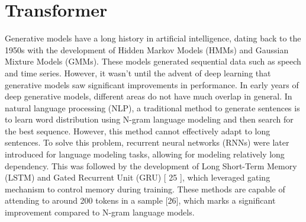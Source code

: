 \documentclass[conference]{IEEEtran}
\begin{document}
\section{Transformer}
\par Generative models have a long history in artificial intelligence, dating back to the 1950s with the
development of Hidden Markov Models (HMMs)\cite{b7} and Gaussian Mixture Models (GMMs)\cite{b8}.
These models generated sequential data such as speech and time series. However, it wasn’t until
the advent of deep learning that generative models saw significant improvements in performance.
In early years of deep generative models, different areas do not have much overlap in general.
In natural language processing (NLP), a traditional method to generate sentences is to learn
word distribution using N-gram language modeling\cite{b9} and then search for the best sequence.
However, this method cannot effectively adapt to long sentences. To solve this problem, recurrent
neural networks (RNNs)\cite{b10} were later introduced for language modeling tasks, allowing for
modeling relatively long dependency. This was followed by the development of Long Short-Term
Memory (LSTM)\cite{b11} and Gated Recurrent Unit (GRU) [ 25 ], which leveraged gating mechanism to
control memory during training. These methods are capable of attending to around 200 tokens in a
sample [26], which marks a significant improvement compared to N-gram language models.
\end{document}
